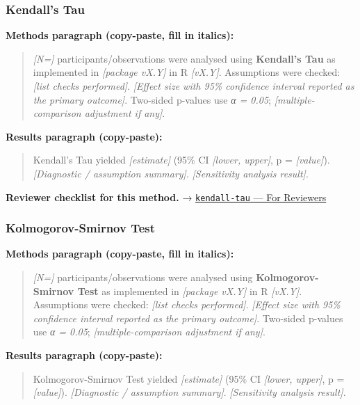 \documentclass[
]{article}
\begin{document}
\subsubsection{Kendall's Tau}\label{kendalls-tau}

\textbf{Methods paragraph (copy-paste, fill in italics):}

\begin{quote}
\emph{{[}N={]}} participants/observations were analysed using
\textbf{Kendall's Tau} as implemented in \emph{{[}package vX.Y{]}} in R
\emph{{[}vX.Y{]}}. Assumptions were checked: \emph{{[}list checks
performed{]}}. \emph{{[}Effect size with 95\% confidence interval
reported as the primary outcome{]}}. Two-sided p-values use \emph{α =
0.05}; \emph{{[}multiple-comparison adjustment if any{]}}.
\end{quote}

\textbf{Results paragraph (copy-paste):}

\begin{quote}
Kendall's Tau yielded \emph{{[}estimate{]}} (95\% CI \emph{{[}lower,
upper{]}}, p = \emph{{[}value{]}}). \emph{{[}Diagnostic / assumption
summary{]}}. \emph{{[}Sensitivity analysis result{]}}.
\end{quote}

\textbf{Reviewer checklist for this method.} →
\href{../chapters/04-inferential/kendall-tau.Rmd\#for-reviewers}{\texttt{kendall-tau}
--- For Reviewers}

\subsubsection{Kolmogorov-Smirnov Test}\label{kolmogorov-smirnov-test}

\textbf{Methods paragraph (copy-paste, fill in italics):}

\begin{quote}
\emph{{[}N={]}} participants/observations were analysed using
\textbf{Kolmogorov-Smirnov Test} as implemented in \emph{{[}package
vX.Y{]}} in R \emph{{[}vX.Y{]}}. Assumptions were checked: \emph{{[}list
checks performed{]}}. \emph{{[}Effect size with 95\% confidence interval
reported as the primary outcome{]}}. Two-sided p-values use \emph{α =
0.05}; \emph{{[}multiple-comparison adjustment if any{]}}.
\end{quote}

\textbf{Results paragraph (copy-paste):}

\begin{quote}
Kolmogorov-Smirnov Test yielded \emph{{[}estimate{]}} (95\% CI
\emph{{[}lower, upper{]}}, p = \emph{{[}value{]}}). \emph{{[}Diagnostic
/ assumption summary{]}}. \emph{{[}Sensitivity analysis result{]}}.
\end{quote}
\end{document}
